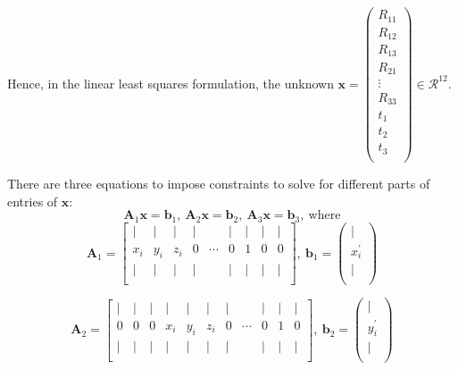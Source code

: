 \begin{questions}
\begin{parts}
\begin{solution}
    Hence, in the linear least squares formulation, the unknown $\mathbf{x}=\left( \begin{array} {c} {R_{11}} \\ {R_{12}} \\ {R_{13}} \\ {R_{21}} \\ \vdots \\ {R_{33}} \\ {t_1} \\ {t_2} \\ {t_3} \\ \end{array} \right) \in \mathcal{R}^{12}$.
    
    There are three equations to impose constraints to solve for different parts of entries of $\mathbf{x}$:
    \[ \mathbf{A}_{1} \mathbf{x} = \mathbf{b}_{1}, \ \mathbf{A}_{2} \mathbf{x} = \mathbf{b}_{2},\ \mathbf{A}_{3} \mathbf{x} = \mathbf{b}_{3}, \ \text{where}\]
    \[ \mathbf{A}_{1} = \begin{bmatrix}
        \vert & \vert & \vert & \vert &        & \vert & \vert & \vert & \vert\\
        x_{i} & y_{i} & z_{i} & 0     & \cdots & 0     & 1     & 0     & 0    \\
        \vert & \vert & \vert & \vert &        & \vert & \vert & \vert & \vert\\
    \end{bmatrix}, \ \mathbf{b}_{1} = \left( \begin{array} {c} \vert \\ x_{i}^{'} \\ \vert \\ \end{array} \right) \]
    
    \[ \mathbf{A}_{2} = \begin{bmatrix}
    \vert&\vert&\vert&\vert&\vert&\vert&\vert&&\vert&\vert&\vert\\
    0&0&0& x_{i} & y_{i}  & z_{i} & 0   & \cdots & 0   & 1 & 0\\
    \vert&\vert&\vert&\vert&\vert&\vert&\vert&&\vert&\vert&\vert\\
    \end{bmatrix}, \ \mathbf{b}_{2} = \left( \begin{array} {c} \vert \\ y_{i}^{'} \\ \vert \\ \end{array} \right) \]
    

\end{solution}
\end{parts}
\end{questions}
